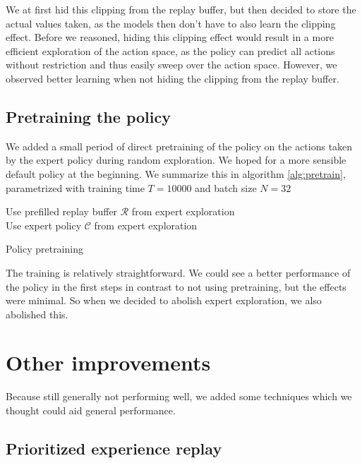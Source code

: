 \documentclass[hyperref,final,beleg]{cgvpub}
\begin{document}
We at first hid this clipping from the replay buffer, but then decided to store the actual values taken, as the models then don't have to also learn the clipping effect. Before we reasoned, hiding this clipping effect would result in a more efficient exploration of the action space, as the policy can predict all actions without restriction and thus easily sweep over the action space. However, we observed better learning when not hiding the clipping from the replay buffer.

\subsection{Pretraining the policy}
\label{sec:pretrain}

We added a small period of direct pretraining of the policy on the actions taken by the expert policy during random exploration. We hoped for a more sensible default policy at the beginning. We summarize this in algorithm \ref{alg:pretrain}, parametrized with training time $T=10000$ and batch size $N=32$

\begin{algorithm}
\SetAlgoLined
Use prefilled replay buffer $\mathcal{R}$ from expert exploration\\
Use expert policy $\mathcal{C}$ from expert exploration\\
\caption{Policy pretraining}
\label{alg:pretrain}
\end{algorithm}

The training is relatively straightforward. We could see a better performance of the policy in the first steps in contrast to not using pretraining, but the effects were minimal. So when we decided to abolish expert exploration, we also abolished this.

\section{Other improvements}

Because still generally not performing well, we added some techniques which we thought could aid general performance.

\subsection{Prioritized experience replay}
\end{document}
